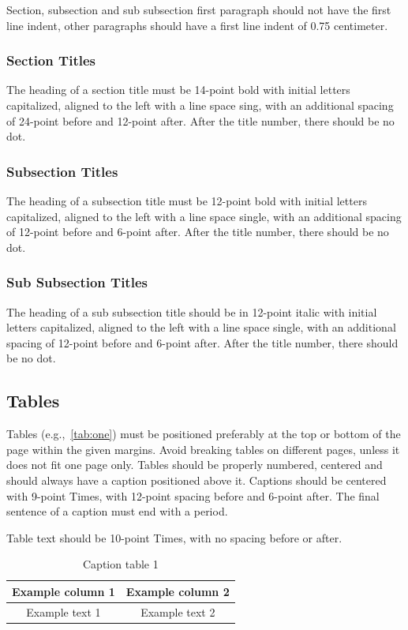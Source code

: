 \documentclass[english,brazilian]{RBIEarticle} %
\begin{document}
Section, subsection and sub subsection first paragraph should not have the first line indent, other paragraphs should have a first line indent of 0.75 centimeter.


\subsubsection{Section Titles}
The heading of a section title must be 14-point bold with initial letters capitalized, aligned to the left with a line space sing, with an additional spacing of 24-point before and 12-point after. After the title number, there should be no dot.


\subsubsection{Subsection Titles}
The heading of a subsection title must be 12-point bold with initial letters capitalized, aligned to the left with a line space single, with an additional spacing of 12-point before and 6-point after. After the title number, there should be no dot.


\subsubsection{Sub Subsection Titles}
The heading of a sub subsection title should be in 12-point italic with initial letters capitalized, aligned to the left with a line space single, with an additional spacing of 12-point before and 6-point after. After the title number, there should be no dot.


\subsection{Tables}
Tables (e.g.,~\autoref{tab:one}) must be positioned preferably at the top or bottom of the page within the given margins. Avoid breaking tables on different pages, unless it does not fit one page only. Tables should be properly numbered, centered and should always have a caption positioned above it. Captions should be centered with 9-point Times, with 12-point spacing before and 6-point after. The final sentence of a caption must end with a period.

Table text should be 10-point Times, with no spacing before or after.

\begin{table}[h]
	\caption{Caption table 1}
	\label{tab:one}
	\centering\footnotesize%
	\begin{tabular}{|c|c|}
		\hline
		\rowcolor{gray} \textbf{Example column 1} & \textbf{Example column 2}\\
		\hline
		Example text 1 & Example text 2\\
		\hline
	\end{tabular}
\end{table}
\end{document}
